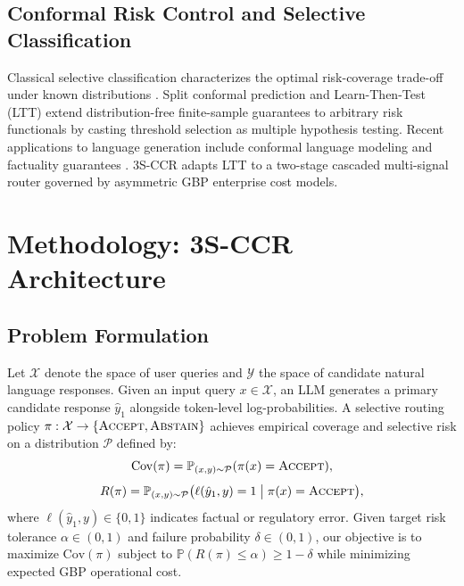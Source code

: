 \documentclass[10pt,conference]{IEEEtran}
\begin{document}
\subsection{Conformal Risk Control and Selective Classification}
Classical selective classification characterizes the optimal risk-coverage trade-off under known distributions \cite{chow1970optimum,el2010foundations,wiener2011agnostic,geifman2017selective,kamath2020selective,varshney2022investigating}. Split conformal prediction \cite{vovk2005algorithmic,shafer2008tutorial,vovk2005algorithmic} and Learn-Then-Test (LTT) \cite{angelopoulos2022ltt,angelopoulos2024conformal,angelopoulos2024conformal} extend distribution-free finite-sample guarantees to arbitrary risk functionals by casting threshold selection as multiple hypothesis testing. Recent applications to language generation include conformal language modeling and factuality guarantees \cite{quach2024conformal,angelopoulos2024conformal}. 3S-CCR adapts LTT to a two-stage cascaded multi-signal router governed by asymmetric GBP enterprise cost models.

\section{Methodology: 3S-CCR Architecture}
\subsection{Problem Formulation}
Let $\mathcal{X}$ denote the space of user queries and $\mathcal{Y}$ the space of candidate natural language responses. Given an input query $x \in \mathcal{X}$, an LLM generates a primary candidate response $\hat{y}_1$ alongside token-level log-probabilities. A selective routing policy $\pi : \mathcal{X} \rightarrow \{\textsc{Accept}, \textsc{Abstain}\}$ achieves empirical coverage and selective risk on a distribution $\mathcal{P}$ defined by:
\begin{equation}
    \mathrm{Cov}(\pi) = \mathbb{P}_{(x,y)\sim\mathcal{P}}(\pi(x) = \textsc{Accept}),
\end{equation}
\begin{equation}
    R(\pi) = \mathbb{P}_{(x,y)\sim\mathcal{P}}\big(\ell(\hat{y}_1, y) = 1 \;\big|\; \pi(x) = \textsc{Accept}\big),
\end{equation}
where $\ell(\hat{y}_1, y) \in \{0, 1\}$ indicates factual or regulatory error. Given target risk tolerance $\alpha \in (0, 1)$ and failure probability $\delta \in (0, 1)$, our objective is to maximize $\mathrm{Cov}(\pi)$ subject to $\mathbb{P}(R(\pi) \le \alpha) \ge 1 - \delta$ while minimizing expected GBP operational cost.
\end{document}
